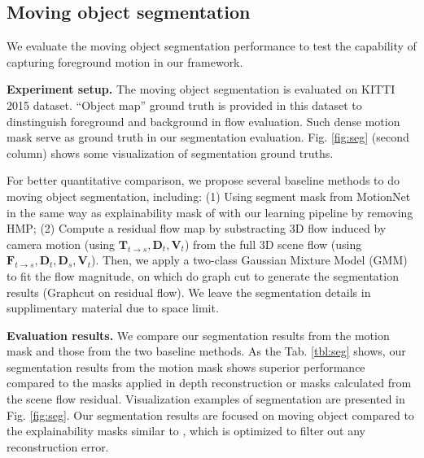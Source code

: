 \documentclass[runningheads]{llncs}
\newcommand{\ve}[1]{{\mathbf #1}} \newcommand{\hua}[1]{{\mathcal #1}}
\begin{document}
\subsection{Moving object segmentation}
\vspace{-0.5\baselineskip}
\label{seg_exp}
We evaluate the moving object segmentation performance to test the capability of capturing foreground motion in our framework.

\vspace{0.5\baselineskip}
\noindent\textbf{Experiment setup.} The moving object segmentation is evaluated on KITTI 2015 dataset. ``Object map'' ground truth is provided in this dataset to dinstinguish foreground and background in flow evaluation. Such dense motion mask serve as ground truth in our segmentation evaluation. Fig. \ref{fig:seg} (second column) shows some visualization of segmentation ground truths. 

For better quantitative comparison, we propose several baseline methods to do moving object segmentation, including: (1) Using segment mask from MotionNet in the same way as explainability mask of \cite{zhou2017unsupervised} with our learning pipeline by removing HMP; 
(2) Compute a residual flow map by substracting 3D flow induced by camera motion (using $\ve{T}_{t\rightarrow s},\ve{D}_t,\ve{V}_t$) from the full 3D scene flow (using $\ve{F}_{t\rightarrow s}, \ve{D}_t, \ve{D}_s, \ve{V}_t$). Then, we apply a two-class Gaussian Mixture Model (GMM) to fit the flow magnitude, on which do graph cut to generate the segmentation results (Graphcut on residual flow). We leave the segmentation details in supplimentary material due to space limit.

\vspace{0.5\baselineskip}
\noindent\textbf{Evaluation results.}
We compare our segmentation results from the motion mask and those from the two baseline methods. As the Tab. \ref{tbl:seg} shows, our segmentation results from the motion mask shows superior performance compared to the masks applied in depth reconstruction or masks calculated from the scene flow residual. Visualization examples of segmentation are presented in Fig. \ref{fig:seg}. Our segmentation results are focused on moving object compared to the explainability masks similar to \cite{zhou2017unsupervised}, which is optimized to filter out any reconstruction error.
\end{document}
